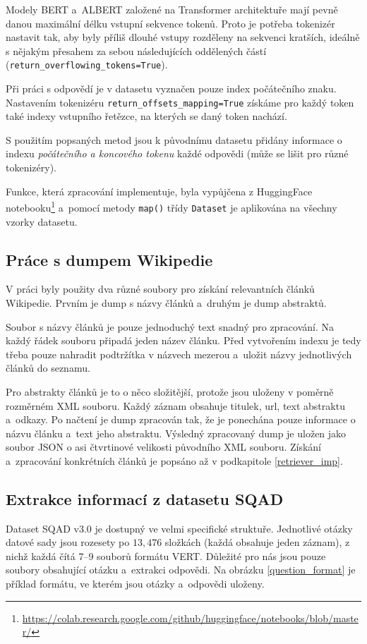 Modely BERT a~ALBERT založené na Transformer architektuře mají pevně danou maximální délku vstupní sekvence tokenů. Proto je potřeba tokenizér nastavit tak, aby byly příliš dlouhé vstupy rozděleny na sekvenci kratších, ideálně s nějakým přesahem za sebou následujících oddělených částí (\texttt{return\_overflowing\_tokens=True}).\par
Při práci s odpovědí je v datasetu vyznačen pouze index počátečního znaku. Nastavením tokenizéru \texttt{return\_offsets\_mapping=True} získáme pro každý token také indexy vstupního řetězce, na kterých se daný token nachází.\par
S použitím popsaných metod jsou k původnímu datasetu přidány informace o indexu \emph{počátečního a koncového tokenu} každé odpovědi (může se lišit pro různé tokenizéry).\par 
Funkce, která zpracování implementuje, byla vypůjčena z HuggingFace notebooku\footnote{\url{https://colab.research.google.com/github/huggingface/notebooks/blob/master/}} a~pomocí metody \texttt{map()} třídy \texttt{Dataset} je aplikována na všechny vzorky datasetu.

\subsection{Práce s dumpem Wikipedie}
V práci byly použity dva různé soubory pro získání relevantních článků Wikipedie. Prvním je dump s názvy článků a~druhým je dump abstraktů.\par
Soubor s názvy článků je pouze jednoduchý text snadný pro zpracování. Na každý řádek souboru připadá jeden název článku. Před vytvořením indexu je tedy třeba pouze nahradit podtržítka v názvech mezerou a~uložit názvy jednotlivých článků do seznamu.\par
Pro abstrakty článků je to o něco složitější, protože jsou uloženy v poměrně rozměrném XML souboru. Každý záznam obsahuje titulek, url, text abstraktu a~odkazy. Po načtení je dump zpracován tak, že je ponechána pouze informace o názvu článku a~text jeho abstraktu. Výsledný zpracovaný dump je uložen jako soubor JSON o asi čtvrtinové velikosti původního XML souboru. Získání a~zpracování konkrétních článků je popsáno až v podkapitole \ref{retriever_imp}.

\subsection{Extrakce informací z datasetu SQAD}
Dataset SQAD v3.0 \cite{sqad_download} je dostupný ve velmi specifické struktuře. Jednotlivé otázky datové sady jsou rozesety po $13,476$ složkách (každá obsahuje jeden záznam), z nichž každá čítá \mbox{7--9} souborů formátu VERT. Důležité pro nás jsou pouze soubory obsahující otázku a~extrakci odpovědi. Na obrázku \ref{question_format} je příklad formátu, ve kterém jsou otázky a~odpovědi uloženy. 

